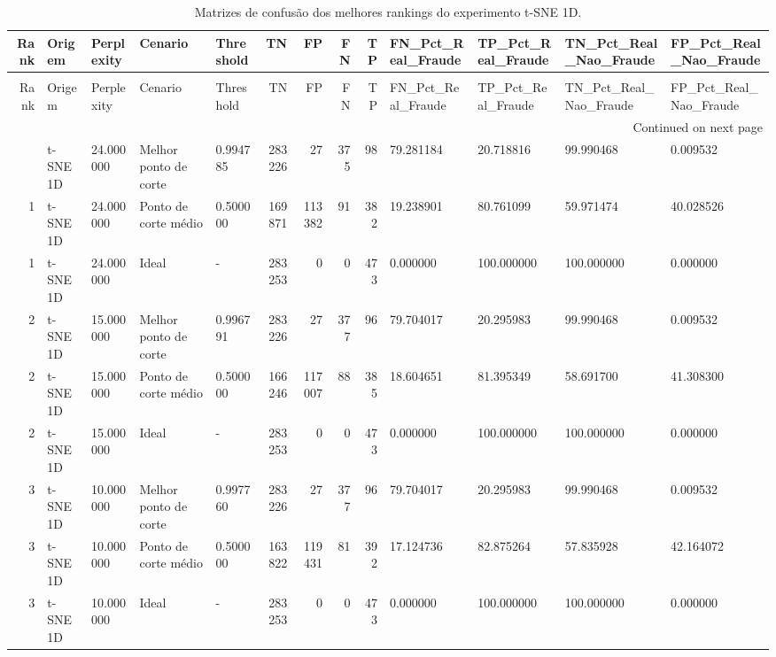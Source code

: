 \begin{longtable}{rllllrrrrllll}
\caption{Matrizes de confusão dos melhores rankings do experimento t-SNE 1D.} \label{tab:matrizes-ranks-tsne-1d} \\
\toprule
Rank & Origem & Perplexity & Cenario & Threshold & TN & FP & FN & TP & FN\_Pct\_Real\_Fraude & TP\_Pct\_Real\_Fraude & TN\_Pct\_Real\_Nao\_Fraude & FP\_Pct\_Real\_Nao\_Fraude \\
\midrule
\endfirsthead
\caption[]{Matrizes de confusão dos melhores rankings do experimento t-SNE 1D.} \\
\toprule
Rank & Origem & Perplexity & Cenario & Threshold & TN & FP & FN & TP & FN\_Pct\_Real\_Fraude & TP\_Pct\_Real\_Fraude & TN\_Pct\_Real\_Nao\_Fraude & FP\_Pct\_Real\_Nao\_Fraude \\
\midrule
\endhead
\midrule
\multicolumn{13}{r}{Continued on next page} \\
\midrule
\endfoot
\bottomrule
\endlastfoot
1 & t-SNE 1D & 24.000000 & Melhor ponto de corte & 0.994785 & 283226 & 27 & 375 & 98 & 79.281184 & 20.718816 & 99.990468 & 0.009532 \\
1 & t-SNE 1D & 24.000000 & Ponto de corte médio & 0.500000 & 169871 & 113382 & 91 & 382 & 19.238901 & 80.761099 & 59.971474 & 40.028526 \\
1 & t-SNE 1D & 24.000000 & Ideal & - & 283253 & 0 & 0 & 473 & 0.000000 & 100.000000 & 100.000000 & 0.000000 \\
2 & t-SNE 1D & 15.000000 & Melhor ponto de corte & 0.996791 & 283226 & 27 & 377 & 96 & 79.704017 & 20.295983 & 99.990468 & 0.009532 \\
2 & t-SNE 1D & 15.000000 & Ponto de corte médio & 0.500000 & 166246 & 117007 & 88 & 385 & 18.604651 & 81.395349 & 58.691700 & 41.308300 \\
2 & t-SNE 1D & 15.000000 & Ideal & - & 283253 & 0 & 0 & 473 & 0.000000 & 100.000000 & 100.000000 & 0.000000 \\
3 & t-SNE 1D & 10.000000 & Melhor ponto de corte & 0.997760 & 283226 & 27 & 377 & 96 & 79.704017 & 20.295983 & 99.990468 & 0.009532 \\
3 & t-SNE 1D & 10.000000 & Ponto de corte médio & 0.500000 & 163822 & 119431 & 81 & 392 & 17.124736 & 82.875264 & 57.835928 & 42.164072 \\
3 & t-SNE 1D & 10.000000 & Ideal & - & 283253 & 0 & 0 & 473 & 0.000000 & 100.000000 & 100.000000 & 0.000000 \\
\end{longtable}
